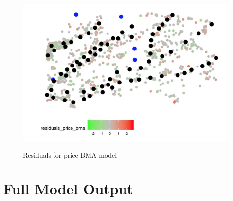 \documentclass[10pt]{jmlr}%
\begin{document}
\begin{figure}[htbp]
	\centering
	\caption{Residuals for price BMA model}
	\includegraphics[width=0.5\linewidth]{residual_map_price.png}
	\label{fig:map_residuals}
\end{figure}


\newpage  %


\section{Full Model Output}




\end{document}
